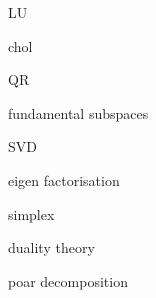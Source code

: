 \def\todo{\item[$\blacktriangleright$]}
\def\done{\item[$\circledcirc$]}
\begin{slide}
\begin{multicols*}{2}
\begin{description}
	\itemsep0pt
	\done LU
	\done chol
	\todo QR
	\done fundamental subspaces
	\todo SVD
	\todo eigen factorisation
	\todo simplex
	\todo duality theory
	\todo poar decomposition
\end{description}
\end{multicols*}
\end{slide}

